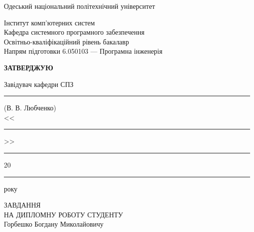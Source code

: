 \def\rl#1{\rule{#1}{1pt}}
\begin{center}Одеський національний політехнічний університет\end{center}
Інститут комп'ютерних систем\\
Кафедра системного програмного забезпечення\\
Освітньо-кваліфікаційний рівень	бакалавр\\
Напрям підготовки 6.050103 --- Програмна інженерія

\begin{flushright}
\begin{minipage}{75mm}
 \begin{center}\textbf{\MakeUppercase{Затверджую}}\end{center}
 Завідувач кафедри СПЗ\\
 \rl{35mm} (В. В. Любченко)\\
 <<\rl{8mm}>>\rl{35mm}20\rl{7mm}року
\end{minipage}
\end{flushright}
\vspace{15mm}
\begin{center}\MakeUppercase{Завдання}\\\MakeUppercase{на дипломну роботу студенту}\\Горбешко Богдану Миколайовичу\end{center}
